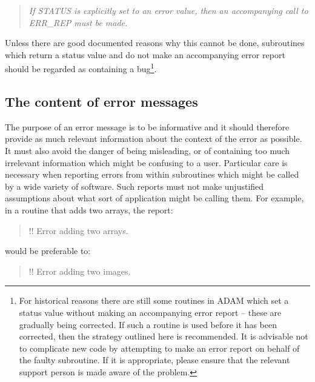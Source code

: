 \documentclass[twoside,11pt]{starlink}
\begin{document}
\begin {quote}
\emph{If STATUS is explicitly set to an error value, then an accompanying
call to ERR\_REP \emph{must} be made.}
\end {quote}

Unless there are good documented reasons why this cannot be done,
subroutines which return a status value and do not make an accompanying
error report should be regarded as containing a bug\footnote{For historical
reasons there are still some routines in ADAM which
set a status value without making an accompanying error report -- these are
gradually being corrected.
If such a routine is used before it has been corrected, then the strategy
outlined here is recommended.
It is advisable not to complicate new code by attempting to make an error
report on behalf of the faulty subroutine.
If it is appropriate, please ensure that the relevant support person is made
aware of the problem.}.

\subsection{The content of error messages}

The purpose of an error message is to be informative and it should
therefore provide as much relevant information about the context of the
error as possible.
It must also avoid the danger of being misleading, or of containing
too much irrelevant information which might be confusing to a user.
Particular care is necessary when reporting errors from within subroutines
which might be called by a wide variety of software.
Such reports must not make unjustified assumptions about what sort of
application might be calling them.
For example, in a routine that adds two arrays, the report:

\begin {quote}
\begin {small}
\begin{terminalv}
!! Error adding two arrays.
\end{terminalv}
\end {small}
\end {quote}

would be preferable to:

\begin {quote}
\begin {small}
\begin{terminalv}
!! Error adding two images.
\end{terminalv}
\end {small}
\end {quote}
\end{document}
